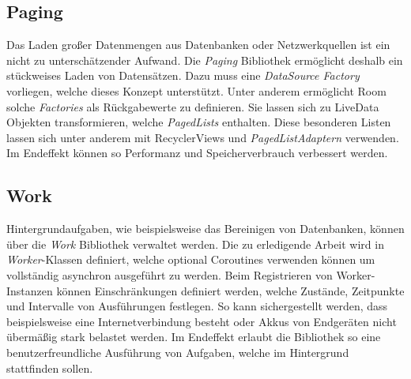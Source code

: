 \subsection{Paging}
\label{subsec:app:jetpack:paging}
Das Laden großer Datenmengen aus Datenbanken oder Netzwerkquellen ist ein nicht zu unterschätzender Aufwand.
Die \textit{Paging} Bibliothek ermöglicht deshalb ein stückweises Laden von Datensätzen.
Dazu muss eine \textit{DataSource Factory} vorliegen, welche dieses Konzept unterstützt.
Unter anderem ermöglicht Room solche \textit{Factories} als Rückgabewerte zu definieren.
Sie lassen sich zu LiveData Objekten transformieren, welche \textit{PagedLists} enthalten.
Diese besonderen Listen lassen sich unter anderem mit RecyclerViews und \textit{PagedListAdaptern} verwenden.
Im Endeffekt können so Performanz und Speicherverbrauch verbessert werden.

\subsection{Work}
\label{subsec:app:jetpack:work}
Hintergrundaufgaben, wie beispielsweise das Bereinigen von Datenbanken, können über die \textit{Work} Bibliothek verwaltet werden.
Die zu erledigende Arbeit wird in \textit{Worker}-Klassen definiert, welche optional Coroutines verwenden können um vollständig asynchron ausgeführt zu werden.
Beim Registrieren von Worker-Instanzen können Einschränkungen definiert werden, welche Zustände, Zeitpunkte und Intervalle von Ausführungen festlegen.
So kann sichergestellt werden, dass beispielsweise eine Internetverbindung besteht oder Akkus von Endgeräten nicht übermäßig stark belastet werden.
Im Endeffekt erlaubt die Bibliothek so eine benutzerfreundliche Ausführung von Aufgaben, welche im Hintergrund stattfinden sollen.

